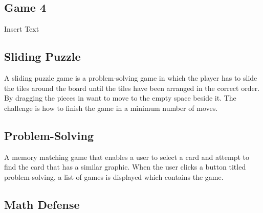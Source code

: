 \documentclass[12pt]{article}
\begin{document}
    \subsection{Game 4}

    Insert Text

    \subsection{Sliding Puzzle}

    A sliding puzzle game is a problem-solving game in which the player has to slide the tiles around the board until the tiles have been arranged in the correct order. By dragging the pieces in want to move to the empty space beside it. The challenge is how to finish the game in a minimum number of moves.

    \subsection{Problem-Solving}
    A memory matching game that enables a user to select a card and attempt to find the card that has a similar graphic. When the user clicks a button titled problem-solving, a list of games is displayed which contains the game.  
    
    \newpage

    \subsection{Math Defense}
\end{document}
